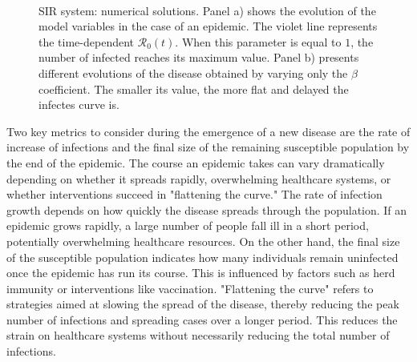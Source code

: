\begin{figure}[ht]
	\centering
	 \\
	\caption[SIR dynamic example]{SIR system: numerical solutions. Panel a) shows the evolution of the model variables in the case of an epidemic. The violet line represents the time-dependent $\mathcal{R}_0(t)$. When this parameter is equal to $1$, the number of infected reaches its maximum value. Panel b) presents different evolutions of the disease obtained by varying only the $\beta$ coefficient. The smaller its value, the more flat and delayed the infectes curve is.}
	\label{fig:sir_example0}
\end{figure}
Two key metrics to consider during the emergence of a new disease are the rate of increase of infections and the final size of the remaining susceptible population by the end of the epidemic. The course an epidemic takes can vary dramatically depending on whether it spreads rapidly, overwhelming healthcare systems, or whether interventions succeed in "flattening the curve."
The rate of infection growth depends on how quickly the disease spreads through the population. If an epidemic grows rapidly, a large number of people fall ill in a short period, potentially overwhelming healthcare resources.
On the other hand, the final size of the susceptible population indicates how many individuals remain uninfected once the epidemic has run its course. This is influenced by factors such as herd immunity or interventions like vaccination.
"Flattening the curve" refers to strategies aimed at slowing the spread of the disease, thereby reducing the peak number of infections and spreading cases over a longer period. This reduces the strain on healthcare systems without necessarily reducing the total number of infections.

